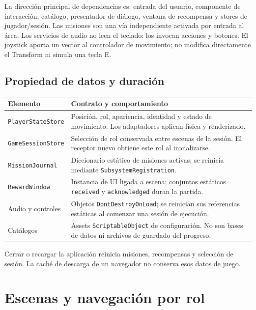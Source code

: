 \documentclass[11pt,letterpaper,oneside]{article}
\makeatletter
\newcommand{\code}[1]{\nolinkurl{#1}}
\newenvironment{spec}{\begingroup\small\begin{longtable}{@{}>{\raggedright\arraybackslash}p{0.32\textwidth}>{\raggedright\arraybackslash}p{0.64\textwidth}@{}}\toprule\textbf{Elemento} & \textbf{Contrato y comportamiento} \\ \midrule\endhead}{\bottomrule\end{longtable}\endgroup}
\makeatother
\begin{document}
La dirección principal de dependencias es: entrada del usuario, componente de interacción, catálogo, presentador de diálogo, ventana de recompensa y stores de jugador/sesión. Las misiones son una vía independiente activada por entrada al área. Los servicios de audio no leen el teclado: los invocan acciones y botones. El joystick aporta un vector al controlador de movimiento; no modifica directamente el Transform ni simula una tecla E.

\subsection{Propiedad de datos y duración}
\begin{spec}
\code{PlayerStateStore} & Posición, rol, apariencia, identidad y estado de movimiento. Los adaptadores aplican física y renderizado. \\
\code{GameSessionStore} & Selección de rol conservada entre escenas de la sesión. El receptor nuevo obtiene este rol al inicializarse. \\
\code{MissionJournal} & Diccionario estático de misiones activas; se reinicia mediante \code{SubsystemRegistration}. \\
\code{RewardWindow} & Instancia de UI ligada a escena; conjuntos estáticos \code{received} y \code{acknowledged} duran la partida. \\
Audio y controles & Objetos \code{DontDestroyOnLoad}; se reinician sus referencias estáticas al comenzar una sesión de ejecución. \\
Catálogos & Assets \code{ScriptableObject} de configuración. No son bases de datos ni archivos de guardado del progreso. \\
\end{spec}
Cerrar o recargar la aplicación reinicia misiones, recompensas y selección de sesión. La caché de descarga de un navegador no conserva esos datos de juego.

\section{Escenas y navegación por rol}
\end{document}

